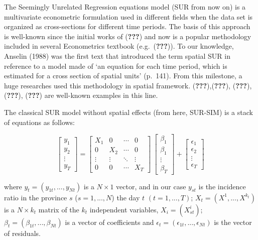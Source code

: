 \documentclass[]{elsarticle} %
\begin{document}
The Seemingly Unrelated Regression equations model (SUR from now on) is
a multivariate econometric formulation used in different fields when the
data set is organized as cross-sections for different time periods. The
basis of this approach is well-known since the initial works of
({\textbf{???}}) and now is a popular methodology included in several
Econometrics textbook (e.g.~({\textbf{???}})). To our knowledge, Anselin
(1988) was the first text that introduced the term spatial SUR in
reference to a model made of `an equation for each time period, which is
estimated for a cross section of spatial units' (p.~141). From this
milestone, a huge researches used this methodology in spatial framework.
({\textbf{???}}),({\textbf{???}}), ({\textbf{???}}), ({\textbf{???}}),
({\textbf{???}}) are well-known examples in this line.

The classical SUR model without spatial effects (from here, SUR-SIM) is
a stack of equations as follows:

\begin{equation}
\label{eq:sur-sim}
\begin{bmatrix}
y_1 \\ y_2 \\ \vdots \\ y_T
\end{bmatrix}
=
\begin{bmatrix}
X_1 & 0 & \cdots & 0 \\ 0 & X_2 & \cdots & 0 \\ \vdots & \vdots & \ddots & \vdots \\ 0 & 0 & \cdots & X_T
\end{bmatrix}
\
\begin{bmatrix}
\beta_1 \\ \beta_1 \\ \vdots \\ \beta_T
\end{bmatrix}
+
\begin{bmatrix}
\epsilon_1 \\ \epsilon_2 \\ \vdots \\ \epsilon_T
\end{bmatrix}
\end{equation}

\noindent where \(y_{t}=(y_{1t},...,y_{Nt})\) is a \(N \times 1\)
vector, and in our case \(y_{st}\) is the incidence ratio in the
province \(s\) (\(s=1,...,N\)) the day \(t\) \((t=1,...,T)\);
\(X_t=(X^1,...,X^{k_t})\) is a \(N \times k_t\) matrix of the \(k_t\)
independent variables, \(X_i=(X^i_{st})\);
\(\beta_t=(\beta_{1t},...,\beta_{Nt})\) is a vector of coefficients and
\(\epsilon_t=(\epsilon_{1t},...,\epsilon_{Nt})\) is the vector of
residuals.
\end{document}
